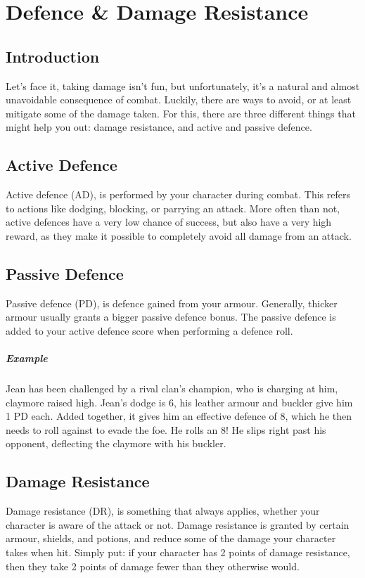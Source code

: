 \chapter{Defence \& Damage Resistance}\label{chap:defence}
\section{Introduction}
Let's face it, taking damage isn't fun, but unfortunately, it's a natural and almost unavoidable consequence of combat.
Luckily, there are ways to avoid, or at least mitigate some of the damage taken.
For this, there are three different things that might help you out: damage resistance, and active and passive defence.

\section{Active Defence}
Active defence (AD), is performed by your character during combat.
This refers to actions like dodging, blocking, or parrying an attack.
More often than not, active defences have a very low chance of success, but also have a very high reward,
as they make it possible to completely avoid all damage from an attack.

\section{Passive Defence}
Passive defence (PD), is defence gained from your armour.
Generally, thicker armour usually grants a bigger passive defence bonus.
The passive defence is added to your active defence score when performing a defence roll.

\paragraph{Example} Jean has been challenged by a rival clan's champion, who is charging at him, claymore raised high.
Jean's dodge is 6, his leather armour and buckler give him 1 PD each.
Added together, it gives him an effective defence of 8, which he then needs to roll against to evade the foe.
He rolls an 8! He slips right past his opponent, deflecting the claymore with his buckler.

\section{Damage Resistance}
Damage resistance (DR), is something that always applies, whether your character is aware of the attack or not.
Damage resistance is granted by certain armour, shields, and potions, and reduce some of the damage your character takes when hit.
Simply put: if your character has 2 points of damage resistance, then they take 2 points of damage fewer than they otherwise would.

